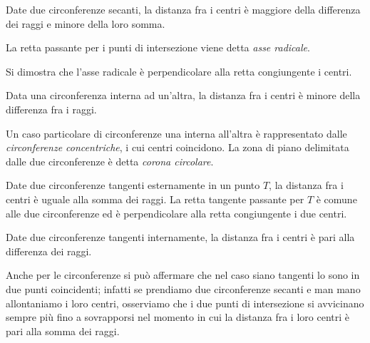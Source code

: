 \begin{teorema}
Date due circonferenze secanti, la distanza fra i centri è maggiore della differenza dei raggi e minore della loro somma.
\end{teorema}

\begin{figure}[htb]
	\centering
\end{figure}

La retta passante per i punti di intersezione viene detta \emph{asse radicale}.

Si dimostra che l'asse radicale è perpendicolare alla retta congiungente i centri.

\begin{teorema}
Data una circonferenza interna ad un'altra, la distanza fra i centri è minore della differenza fra i raggi.
\end{teorema}

\begin{figure}[htb]
	\centering\hspace{1.5cm}
\end{figure}

Un caso particolare di circonferenze una interna all'altra è rappresentato dalle \emph{circonferenze concentriche}, i cui centri coincidono. La zona di piano delimitata dalle due circonferenze è detta \emph{corona circolare}.

\begin{teorema}
Date due circonferenze tangenti esternamente in un punto $T$, la distanza fra i centri è uguale alla somma dei raggi. La retta tangente passante per $T$ è comune alle due circonferenze ed è perpendicolare alla retta congiungente i due centri.
\end{teorema}

\begin{figure}[htb]
	\centering
\end{figure}

\begin{teorema}
Date due circonferenze tangenti internamente, la distanza fra i centri è pari alla differenza dei raggi.
\end{teorema}


Anche per le circonferenze si può affermare che nel caso siano tangenti lo sono in due punti coincidenti; infatti se prendiamo due circonferenze secanti e man mano allontaniamo i loro centri, osserviamo che i due punti di intersezione si avvicinano sempre più fino a sovrapporsi nel momento in cui la distanza fra i loro centri è pari alla somma dei raggi.

